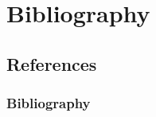 \documentclass[]{beamer}
\begin{document}
	
	

\section{Bibliography}
\subsection{References}
\begin{frame}[t,allowframebreaks]
\frametitle{Bibliography}
\nocite{*}
\printbibliography[heading=none]
\end{frame}
\end{document}
